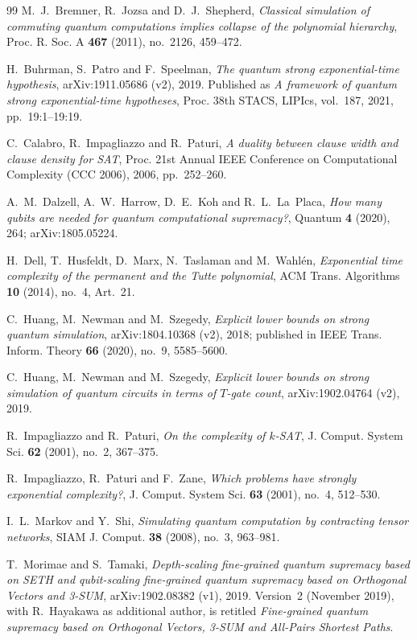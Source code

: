 \documentclass[10pt]{amsart}
\theoremstyle{plain}
\theoremstyle{definition}
\theoremstyle{remark}
\numberwithin{equation}{section}
\begin{document}
\begin{thebibliography}{99}
M.~J.~Bremner, R.~Jozsa and D.~J.~Shepherd, \emph{Classical simulation of commuting quantum
computations implies collapse of the polynomial hierarchy}, Proc. R. Soc. A \textbf{467} (2011),
no.~2126, 459--472.

H.~Buhrman, S.~Patro and F.~Speelman, \emph{The quantum strong exponential-time hypothesis},
arXiv:1911.05686 (v2), 2019. Published as \emph{A framework of quantum strong exponential-time
hypotheses}, Proc. 38th STACS, LIPIcs, vol.~187, 2021, pp.~19:1--19:19.

C.~Calabro, R.~Impagliazzo and R.~Paturi, \emph{A duality between clause width and clause density
for {SAT}}, Proc. 21st Annual IEEE Conference on Computational Complexity (CCC 2006), 2006,
pp.~252--260.

A.~M.~Dalzell, A.~W.~Harrow, D.~E.~Koh and R.~L.~La~Placa, \emph{How many qubits are needed for
quantum computational supremacy?}, Quantum \textbf{4} (2020), 264; arXiv:1805.05224.

H.~Dell, T.~Husfeldt, D.~Marx, N.~Taslaman and M.~Wahl{\'e}n, \emph{Exponential time complexity of
the permanent and the {T}utte polynomial}, ACM Trans. Algorithms \textbf{10} (2014), no.~4, Art.~21.

C.~Huang, M.~Newman and M.~Szegedy, \emph{Explicit lower bounds on strong quantum simulation},
arXiv:1804.10368 (v2), 2018; published in IEEE Trans. Inform. Theory \textbf{66} (2020), no.~9,
5585--5600.

C.~Huang, M.~Newman and M.~Szegedy, \emph{Explicit lower bounds on strong simulation of quantum
circuits in terms of {$T$}-gate count}, arXiv:1902.04764 (v2), 2019.

R.~Impagliazzo and R.~Paturi, \emph{On the complexity of $k$-{SAT}}, J. Comput. System Sci.
\textbf{62} (2001), no.~2, 367--375.

R.~Impagliazzo, R.~Paturi and F.~Zane, \emph{Which problems have strongly exponential complexity?},
J. Comput. System Sci. \textbf{63} (2001), no.~4, 512--530.

I.~L.~Markov and Y.~Shi, \emph{Simulating quantum computation by contracting tensor networks}, SIAM
J. Comput. \textbf{38} (2008), no.~3, 963--981.

T.~Morimae and S.~Tamaki, \emph{Depth-scaling fine-grained quantum supremacy based on {SETH} and
qubit-scaling fine-grained quantum supremacy based on {O}rthogonal {V}ectors and {3-SUM}},
arXiv:1902.08382 (v1), 2019. Version~2 (November 2019), with R.~Hayakawa as additional author, is
retitled \emph{Fine-grained quantum supremacy based on {O}rthogonal {V}ectors, {3-SUM} and
{A}ll-{P}airs {S}hortest {P}aths}.


\end{thebibliography}
\end{document}
